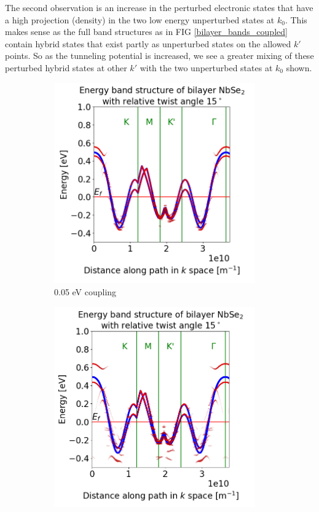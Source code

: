 \documentclass[12pt]{report} %
\begin{document}
The second observation is an increase in the perturbed electronic states that have a high projection (density) in the two low energy unperturbed states at $k_0$. This makes sense as the full band structures as in FIG \ref{bilayer_bands_coupled} contain hybrid states that exist partly as unperturbed states on the allowed $k'$ points. So as the tunneling potential is increased, we see a greater mixing of these perturbed hybrid states at other $k'$ with the two unperturbed states at $k_0$ shown.
%
\begin{figure}[th]
\centering
  \begin{subfigure}[b]{0.475\textwidth}
    \centering
    \includegraphics[width=0.95\textwidth]{0.05_coupling_15_deg.png}
    \caption{0.05 eV coupling}
    \label{bilayer_coupling_0.05}
  \end{subfigure}
  \hfill
  \begin{subfigure}[b]{0.475\textwidth}
    \centering
    \includegraphics[width=0.95\textwidth]{0.1_coupling_15_deg.png}

\end{subfigure}
\end{figure}
\end{document}
